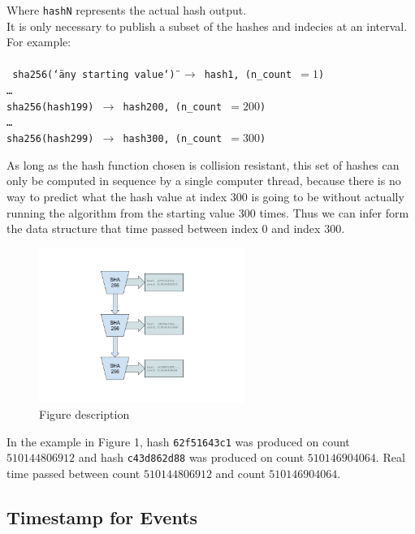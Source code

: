 \documentclass[12pt]{article}
\begin{document}
\noindent Where \texttt{hashN} represents the actual hash output.\\

It is only necessary to publish a subset of the hashes and indecies at an interval.\\

\noindent For example:\\\\\noindent
\texttt{
 sha256(\char`\"any starting value\char`\") $\rightarrow$ hash1, (n\_count~$=1$)\\
\ldots\\
sha256(hash199) $\rightarrow$ hash200, (n\_count~$=200$)\\
\ldots\\
sha256(hash299) $\rightarrow$ hash300, (n\_count~$=300$)\\
}

As long as the hash function chosen is collision resistant, this set of hashes can only be computed in sequence by a single computer thread, because there is no way to predict what the hash value at index $300$ is going to be without actually running the algorithm from the starting value $300$ times.  Thus we can infer form the data structure that time passed between index $0$ and index $300$.

\begin{figure}
  \begin{center}
    \centering
    \includegraphics[width=0.6\textwidth]{figures/fig_2.png}
    \caption[Fig 2]{Figure description \label{fig_2}}
  \end{center}
  \end{figure}

In the example in Figure 1, hash \texttt{62f51643c1} was produced on
count $510144806912$ and hash \texttt{c43d862d88} was produced on
count $510146904064$. Real time passed between count $510144806912$
and count $510146904064$.

\subsection{Timestamp for Events}
\end{document}
